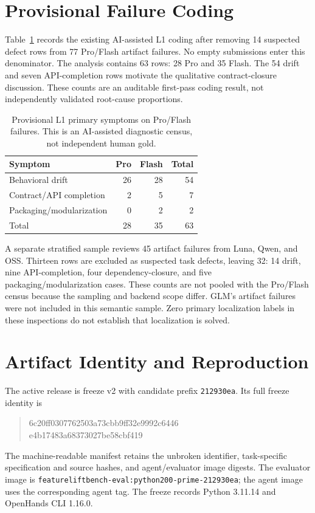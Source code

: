 \documentclass[acmsmall,screen,review,anonymous]{acmart}
\begin{document}
\section{Provisional Failure Coding}
\label{app:diagnostic-counts}

Table~\ref{tab:semantic} records the existing AI-assisted L1 coding after
removing 14 suspected defect rows from 77 Pro/Flash artifact failures. No empty
submissions enter this denominator. The analysis contains 63 rows: 28 Pro and
35 Flash. The 54 drift and seven API-completion rows motivate the qualitative
contract-closure discussion. These counts are an auditable first-pass coding
result, not independently validated root-cause proportions.

\begin{table}[h]
 \caption{Provisional L1 primary symptoms on Pro/Flash failures. This is an
 AI-assisted diagnostic census, not independent human gold.}
 \label{tab:semantic}
 \centering
 \begin{tabular}{@{}lrrr@{}}
 \toprule
 Symptom & Pro & Flash & Total \\
 \midrule
 Behavioral drift & 26 & 28 & 54 \\
 Contract/API completion & 2 & 5 & 7 \\
 Packaging/modularization & 0 & 2 & 2 \\
 \midrule
 Total & 28 & 35 & 63 \\
 \bottomrule
 \end{tabular}
\end{table}

A separate stratified sample reviews 45 artifact failures from Luna, Qwen,
and OSS. Thirteen rows are excluded as suspected task defects, leaving 32:
14 drift, nine API-completion, four dependency-closure, and five
packaging/modularization cases. These counts are not pooled with the Pro/Flash
census because the sampling and backend scope differ. GLM's artifact failures
were not included in this semantic sample. Zero primary localization labels in
these inspections do not establish that localization is solved.

\section{Artifact Identity and Reproduction}
\label{app:reproduction}

The active release is freeze v2 with candidate prefix \texttt{212930ea}.
Its full freeze identity is
\begin{quote}\small\ttfamily
6c20ff0307762503a73cbb9ff32e9992c6446\\
e4b17483a68373027be58cbf419
\end{quote}
The machine-readable manifest retains the unbroken identifier, task-specific
specification and source hashes, and agent/evaluator image digests. The evaluator
image is \texttt{featureliftbench-eval:python200-prime-212930ea}; the agent image
uses the corresponding agent tag. The freeze records Python 3.11.14 and
OpenHands CLI 1.16.0.
\end{document}
